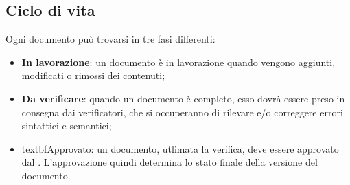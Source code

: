 	\subsection{Ciclo di vita}
	Ogni documento può trovarsi in tre fasi differenti:
	\begin{itemize}
		\item \textbf{In lavorazione}: un documento è in lavorazione quando vengono aggiunti, modificati o rimossi dei contenuti;
		\item \textbf{Da verificare}: quando un documento è completo, esso dovrà essere preso in consegna dai verificatori, che si occuperanno di rilevare e/o correggere errori sintattici e semantici;
		\item textbf{Approvato}: un documento, utlimata la verifica, deve essere approvato dal \RES. L'approvazione quindi determina lo stato finale della versione del documento.
		\end{itemize}